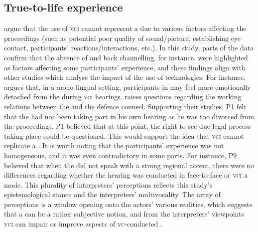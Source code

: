 \documentclass[output=paper]{langsci/langscibook}
\begin{document}
\subsection{True-to-life experience}

 argue that the use of \textsc{vci}  cannot represent a  due to various factors affecting the proceedings (such as potential poor quality of sound/picture, establishing eye contact, participants’ reactions/interactions, etc.). In this study, parts of the data confirm that the absence of  and back channelling, for instance, were highlighted as factors affecting some participants’ experience, and these findings align with other studies which analyse the impact of the use of technologies. For instance, \citet{Radburn-Remfry1994} argues that, in a mono-lingual setting, participants in  may feel more emotionally detached from the  during \textsc{vci} hearings. \citet{Hodges2008} raises questions regarding the working relations between the  and the defence counsel. Supporting their studies, P1 felt that the  had not been taking part in his own hearing as he was too divorced from the proceedings. P1 believed that at this point, the right to see due legal process taking place could be questioned. This would support the idea that \textsc{vci} cannot replicate a . It is worth noting that the participants’ experience was not homogeneous, and it was even contradictory in some parts. For instance, P9 believed that when the  did not speak with a strong regional accent, there were no differences regarding whether the hearing was conducted in face-to-face or \textsc{vci a} mode. This plurality of interpreters’ perceptions reflects this study’s epistemological stance and the interpreters’ multivocality. The array of perceptions is a window opening onto the actors’ various realities, which suggests that a  can be a rather subjective notion, and from the interpreters’ viewpoints \textsc{vci}  can impair or improve aspects of \textsc{vc}-conducted .
\end{document}
